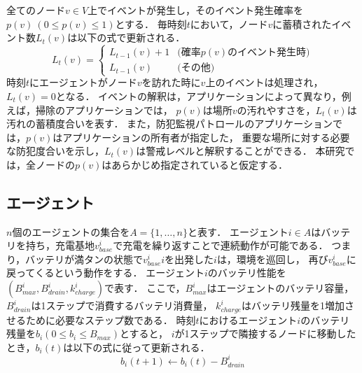 \documentclass[12pt,a4j,twoside]{jarticle}
\def\AgentSet{A}
\def\BatteryLevel{b}
\begin{document}
全てのノード$v\in V$上でイベントが発生し，そのイベント発生確率を$p(v)~(0\leq p(v)\leq 1)$とする．
毎時刻$t$において，ノード$v$に蓄積されたイベント数$L_t(v)$は以下の式で更新される．
%
\[
L_t(v) = \left\{
\begin{array}{ll}
  L_{t-1}(v) + 1 & \textrm{(確率$p(v)$のイベント発生時)} \\
  L_{t-1}(v) & \textrm{(その他)}
\end{array}
\right.
\]
%
時刻$t$にエージェントがノード$v$を訪れた時に$v$上のイベントは処理され，$L_t(v) = 0$となる．
イベントの解釈は，アプリケーションによって異なり，例えば，掃除のアプリケーションでは，
$p(v)$は場所$v$の汚れやすさを，$L_t(v)$は汚れの蓄積度合いを表す．
また，防犯監視パトロールのアプリケーションでは，$p(v)$はアプリケーションの所有者が指定した，
重要な場所に対する必要な防犯度合いを示し，$L_t(v)$は警戒レベルと解釈することができる．
本研究では，全ノードの$p(v)$はあらかじめ指定されていると仮定する．

\subsection{エージェント}
$n$個のエージェントの集合を$\AgentSet=\{1,\dots ,n\}$と表す．
エージェント$i\in\AgentSet$はバッテリを持ち，充電基地$v^i_{base}$で充電を繰り返すことで連続動作が可能である．
つまり，バッテリが満タンの状態で$v^i_{base}i$を出発した$i$は，環境を巡回し，
再び$v^i_{base}$に戻ってくるという動作をする．
エージェント$i$のバッテリ性能を$(B^i_{max}, B^i_{drain}, k^i_{charge})$で表す．
ここで，$B^i_{max}$はエージェントのバッテリ容量，$B^i_{drain}$は1ステップで消費するバッテリ消費量，
$k^i_{charge}$はバッテリ残量を1増加させるために必要なステップ数である．
時刻$t$におけるエージェント$i$のバッテリ残量を$\BatteryLevel_i (0 \leq \BatteryLevel_i \leq B_{max})$とすると，
$i$が1ステップで隣接するノードに移動したとき，$\BatteryLevel_i(t)$は以下の式に従って更新される．
%
\begin{equation}
  \BatteryLevel_i(t+1) \gets \BatteryLevel_i(t) - B^i_{drain}
\end{equation}
%
\par
\end{document}
